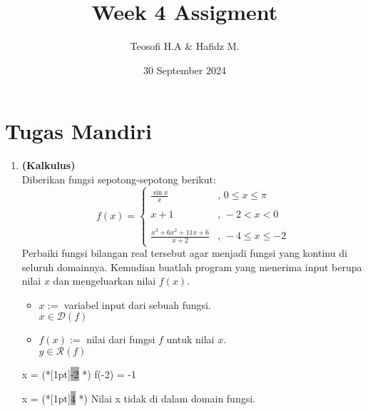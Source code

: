 \documentclass{article}
\title{\textbf{Week 4 Assigment}}
\date{30 September 2024}
\author{Teosofi H.A \& Hafidz M.}
\newcommand{\enter}{\raisebox{-1.8pt}{\begin{tikzpicture}[scale=0.3]
    \draw[thin,fill=lightgray] (0,0) rectangle (2,1);
    \draw (0.3,0.3) -- (0.7,0.3)--(0.7,0.6);     
\end{tikzpicture}}}
\newcommand{\inputscan}[1]{\raisebox{0pt}[1pt]{\colorbox{darkgray}{#1}}}
\begin{document}
    \maketitle

    \section*{Tugas Mandiri}
    \begin{enumerate}[label=\textbf{\arabic*.}]
        \item \textbf{(Kalkulus)}\\
        Diberikan fungsi sepotong-sepotong berikut:
        \[f(x)=\begin{cases}
            \displaystyle \frac{\sin x}{x} &,\,0\leq x\leq\pi\\
            \\
            x+1 &,\,-2<x< 0\\ 
            \\
            \displaystyle\frac{x^3+6x^2+11x+6}{x+2} &,\,-4\leq x\leq-2
        \end{cases}\]
        Perbaiki fungsi bilangan real tersebut agar menjadi fungsi yang kontinu di seluruh domainnya. Kemudian buatlah program yang menerima input berupa nilai $x$ dan mengeluarkan nilai $f(x)$.
        \begin{req}
            \begin{itemize}
                \item $x:=$ variabel input dari sebuah fungsi.\\
                $x\in\mathcal{D}(f)$
            \end{itemize}
        \end{req}
        \begin{out}
            \begin{itemize}
                \item $f(x):=$ nilai dari fungsi $f$ untuk nilai $x$.\\
                $y\in\mathcal{R}(f)$
            \end{itemize}
        \end{out}
        \begin{RunCode}
x = (*\inputscan{-2} \enter*)
f(-2) = -1
        \end{RunCode}
        \begin{RunCode+}
x = (*\inputscan{4} \enter*)
Nilai x tidak di dalam domain fungsi.      
        \end{RunCode+}

\end{enumerate}
\end{document}
